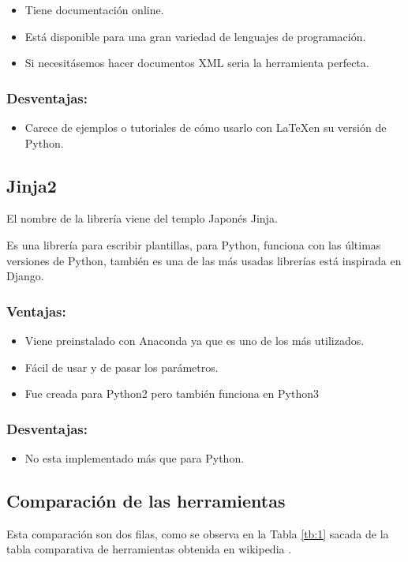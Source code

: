 \begin{itemize}
\item Tiene documentación online.
\item Está disponible para una gran variedad de lenguajes de programación.
\item Si necesitásemos hacer documentos XML seria la herramienta perfecta.
\end{itemize}

\subsubsection{Desventajas:}
\begin{itemize}
\item Carece de ejemplos o tutoriales de cómo usarlo con \LaTeX  en su versión de Python.
\end{itemize}


\subsection{Jinja2}

El nombre de la librería viene del templo Japonés Jinja.

Es una librería para escribir plantillas, para Python, funciona con las últimas versiones de Python, también es una de las más usadas librerías está inspirada en Django.


\subsubsection{Ventajas:}
\begin{itemize}
\item Viene preinstalado con Anaconda ya que es uno de los más utilizados.
\item Fácil de usar y de pasar los parámetros.
\item Fue creada para Python2 pero también funciona en Python3
\end{itemize}

\subsubsection{Desventajas:}
\begin{itemize}
\item No esta implementado más que para Python.
\end{itemize}

\subsection{Comparación de las herramientas}
Esta comparación son dos filas, como se observa en la Tabla \ref{tb:1} sacada de la tabla comparativa de herramientas obtenida en wikipedia \cite{Template:table}.



